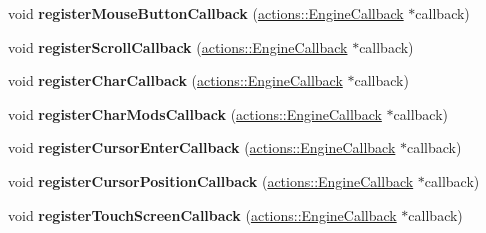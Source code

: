 \begin{DoxyCompactItemize}
\item 
\hypertarget{classfillwave_1_1Engine_a1736b1135a4f1a42cdd6830ec4b40c5b}{}void {\bfseries register\+Mouse\+Button\+Callback} (\hyperlink{classfillwave_1_1actions_1_1EngineCallback}{actions\+::\+Engine\+Callback} $\ast$callback)\label{classfillwave_1_1Engine_a1736b1135a4f1a42cdd6830ec4b40c5b}

\item 
\hypertarget{classfillwave_1_1Engine_a53e2161afc9fbe78a453a516bcc66af8}{}void {\bfseries register\+Scroll\+Callback} (\hyperlink{classfillwave_1_1actions_1_1EngineCallback}{actions\+::\+Engine\+Callback} $\ast$callback)\label{classfillwave_1_1Engine_a53e2161afc9fbe78a453a516bcc66af8}

\item 
\hypertarget{classfillwave_1_1Engine_a646a3870ba2dc8d5e3ee18fafec78fe7}{}void {\bfseries register\+Char\+Callback} (\hyperlink{classfillwave_1_1actions_1_1EngineCallback}{actions\+::\+Engine\+Callback} $\ast$callback)\label{classfillwave_1_1Engine_a646a3870ba2dc8d5e3ee18fafec78fe7}

\item 
\hypertarget{classfillwave_1_1Engine_a126526a78edecf96121bf46efe860434}{}void {\bfseries register\+Char\+Mods\+Callback} (\hyperlink{classfillwave_1_1actions_1_1EngineCallback}{actions\+::\+Engine\+Callback} $\ast$callback)\label{classfillwave_1_1Engine_a126526a78edecf96121bf46efe860434}

\item 
\hypertarget{classfillwave_1_1Engine_afb9188ecbb770607cc4120f7ed65d932}{}void {\bfseries register\+Cursor\+Enter\+Callback} (\hyperlink{classfillwave_1_1actions_1_1EngineCallback}{actions\+::\+Engine\+Callback} $\ast$callback)\label{classfillwave_1_1Engine_afb9188ecbb770607cc4120f7ed65d932}

\item 
\hypertarget{classfillwave_1_1Engine_a3b70461af284fca3b751ab98b3b8e4e3}{}void {\bfseries register\+Cursor\+Position\+Callback} (\hyperlink{classfillwave_1_1actions_1_1EngineCallback}{actions\+::\+Engine\+Callback} $\ast$callback)\label{classfillwave_1_1Engine_a3b70461af284fca3b751ab98b3b8e4e3}

\item 
\hypertarget{classfillwave_1_1Engine_a0c229b7f05a6f87e851c855de806a8cd}{}void {\bfseries register\+Touch\+Screen\+Callback} (\hyperlink{classfillwave_1_1actions_1_1EngineCallback}{actions\+::\+Engine\+Callback} $\ast$callback)\label{classfillwave_1_1Engine_a0c229b7f05a6f87e851c855de806a8cd}


\end{DoxyCompactItemize}
